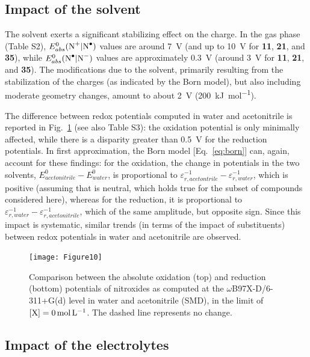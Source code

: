 \documentclass[review,preprint]{elsarticle}
\begin{document}
\clearpage

\subsection{Impact of the solvent} \label{sec:solv}

The solvent exerts a significant stabilizing effect on the charge. In the gas phase (Table S2), $E^0_{abs}(\ce{N+}|\ce{N^.})$ values are around \SI{7}{\volt} (and up to \SI{10}{\volt} for \textbf{11}, \textbf{21}, and \textbf{35}), while $E^0_{abs}(\ce{N^.}|\ce{N-})$ values are approximately \SI{0.3}{\volt} (around \SI{3}{\volt} for \textbf{11}, \textbf{21}, and \textbf{35}). The modifications due to the solvent, primarily resulting from the stabilization of the charges (as indicated by the Born model), but also including moderate geometry changes, amount to about \SI{2}{\volt} (\SI{200}{\kilo\joule\per\mole}).

The difference between redox potentials computed in water and acetonitrile is reported in Fig.~\ref{fig:watvsac} (see also Table S3):  the oxidation potential is only minimally affected, while there is a disparity greater than \SI{0.5}{\volt} for the reduction potentials. In first approximation, the Born model [Eq.~\eqref{eq:born}] can, again, account for these findings: for the oxidation, the change in potentials in the two solvents, $E^0_{acetonitrile} - E^0_{water}$, is proportional to $\varepsilon_{r,acetontrile}^{-1}-\varepsilon_{r,water}^{-1}$, which is positive (assuming that  is neutral, which holds true for the subset of compounds considered here), whereas for the reduction, it is proportional to $\varepsilon_{r,water}^{-1}-\varepsilon_{r,acetonitrile}^{-1}$, which of the same amplitude, but opposite sign. Since this impact is systematic, similar trends (in terms of the impact of substituents) between redox potentials in water and acetonitrile are observed.


\begin{figure}[!h]
	\centering
	\texttt{[image: Figure10]}
	\caption{Comparison between the absolute oxidation (top) and reduction (bottom) potentials of nitroxides as computed at the $\omega$B97X-D/6-311+G(d) level in water and acetonitrile (SMD),  in the limit of $[\ce{X}]=\SI{0}{\mole\per\liter}$. The dashed line represents no change. }
	\label{fig:watvsac}
\end{figure}

\clearpage
\subsection{Impact of the electrolytes} \label{sec:elect}
\end{document}
